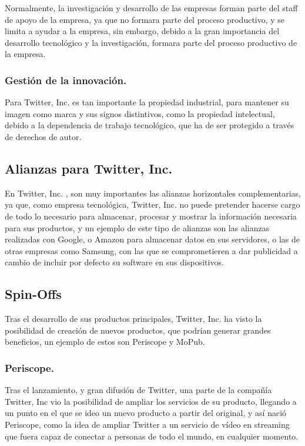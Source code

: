 Normalmente, la investigación y desarrollo de las empresas forman parte del staff de apoyo de la empresa, ya que no formara parte del proceso productivo, y se limita a ayudar a la empresa, sin embargo, debido a la gran importancia del desarrollo tecnológico y la investigación, formara parte del proceso productivo de la empresa.

\subsubsection{Gestión de la innovación.}

Para Twitter, Inc. es tan importante la propiedad industrial, para mantener su imagen como marca y sus signos distintivos, como la propiedad intelectual, debido a la dependencia de trabajo tecnológico, que ha de ser protegido a través de derechos de autor.


\subsection{Alianzas para Twitter, Inc.}

En Twitter, Inc. , son muy importantes las alianzas horizontales complementarias, ya que, como empresa tecnológica, Twitter, Inc. no puede pretender hacerse cargo de todo lo necesario para almacenar, procesar y mostrar la información necesaria para sus productos, y un ejemplo de este tipo de alianzas son las alianzas realizadas con Google, o Amazon para almacenar datos en sus servidores, o las de otras empresas como Samsung, con las que se comprometieren a dar publicidad a cambio de incluir por defecto su software en sus dispositivos.

\subsection{Spin-Offs}

Tras el desarrollo de sus productos principales, Twitter, Inc. ha visto la posibilidad de creación de nuevos productos, que podrían generar grandes beneficios, un ejemplo de estos son Periscope y MoPub.

\subsubsection{Periscope.}

Tras el lanzamiento, y gran difusión de Twitter, una parte de la compañía Twitter, Inc vio la posibilidad de ampliar los servicios de su producto, llegando a un punto en el que se ideo un nuevo producto a partir del original, y así nació Periscope, como la idea de ampliar Twitter a un servicio de vídeo en streaming que fuera capaz de conectar a personas de todo el mundo, en cualquier momento.

